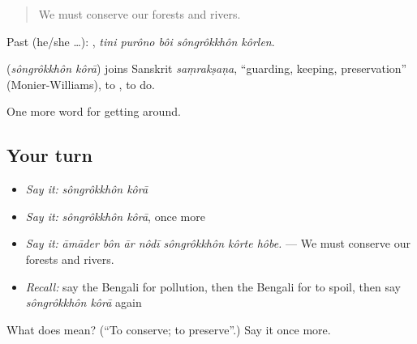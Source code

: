 \begin{quote}
We must conserve our forests and rivers.
\end{quote}

Past (he/she …):     , \emph{tini purôno bôi sôngrôkkhôn kôrlen}.

\begin{cousinweb}
\textbf{ } (\emph{sôngrôkkhôn kôrā}) joins Sanskrit \emph{saṃrakṣaṇa}, \textquotedblleft{}guarding, keeping, preservation\textquotedblright{} (Monier-Williams), to , to do.
\end{cousinweb}

\begin{grammarlens}[title={What you've built}]
One more word for getting around.
\end{grammarlens}

\subsection*{Your turn}
\begin{itemize}
\raggedright
  \item \emph{Say it:} \emph{sôngrôkkhôn kôrā}
  \item \emph{Say it:} \emph{sôngrôkkhôn kôrā}, once more
  \item \emph{Say it:} \emph{āmāder bôn ār nôdī sôngrôkkhôn kôrte hôbe.} — We must conserve our forests and rivers.
  \item \emph{Recall:} say the Bengali for pollution, then the Bengali for to spoil, then say \emph{sôngrôkkhôn kôrā} again
\end{itemize}

\begin{tcolorbox}[breakable,colback=teal!4,colframe=teal!35!black,title={Before you move on}]
What does   mean? (\textquotedblleft{}To conserve; to preserve\textquotedblright{}.) Say it once more.
\end{tcolorbox}
